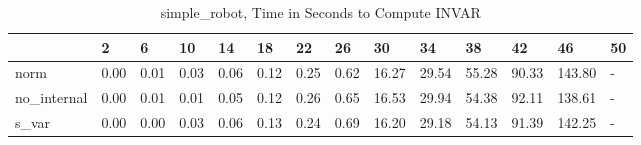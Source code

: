 \begin{table}
\caption{simple_robot, Time in Seconds to Compute INVAR}
\label{simple_robot_INVAR_time}
\begin{tabular}{llllllllllllll}
\toprule
 & 2 & 6 & 10 & 14 & 18 & 22 & 26 & 30 & 34 & 38 & 42 & 46 & 50 \\
\midrule
norm & 0.00 & 0.01 & 0.03 & 0.06 & 0.12 & 0.25 & 0.62 & 16.27 & 29.54 & 55.28 & 90.33 & 143.80 & - \\
no_internal & 0.00 & 0.01 & 0.01 & 0.05 & 0.12 & 0.26 & 0.65 & 16.53 & 29.94 & 54.38 & 92.11 & 138.61 & - \\
s_var & 0.00 & 0.00 & 0.03 & 0.06 & 0.13 & 0.24 & 0.69 & 16.20 & 29.18 & 54.13 & 91.39 & 142.25 & - \\
\bottomrule
\end{tabular}
\end{table}
